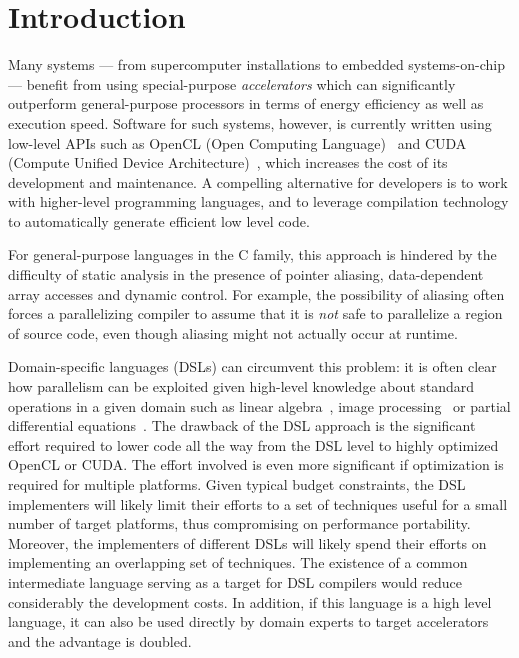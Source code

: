 \section{Introduction}

Many systems --- from supercomputer installations to embedded
systems-on-chip --- benefit from using special-purpose
{\em accelerators} which can significantly outperform general-purpose
processors in terms of energy efficiency as well as
execution speed.
Software for such systems, however, is currently written using
low-level APIs
such as OpenCL (Open Computing Language)~\cite{stoneopencl} and
CUDA (Compute Unified Device Architecture)~\cite{cudaref},
which increases the cost of
its development and maintenance.
A compelling alternative for developers is to work with higher-level
programming languages, and to leverage compilation technology to automatically
generate efficient low level code.

For general-purpose languages in the C family, this approach is hindered
by the difficulty of static analysis in the presence of pointer aliasing,
data-dependent array accesses and dynamic control.
For example, the possibility of aliasing often forces a parallelizing compiler
to assume that it is \emph{not} safe to parallelize a region of source
code, even though aliasing might not actually
occur at runtime.

Domain-specific languages (DSLs)
can circumvent this problem: it is often
clear how parallelism can be exploited given
high-level knowledge about standard operations in a given domain such as
linear algebra~\cite{vobla2014},
image processing~\cite{DBLP:conf/pldi/Ragan-KelleyBAPDA13}
or partial differential equations~\cite{DBLP:journals/toms/AlnaesLORW14}.
The drawback of the DSL approach is the significant effort required to
lower code all the way from the DSL level to highly optimized OpenCL or CUDA.
The effort involved is even more significant if optimization is required
for multiple platforms.
Given typical budget constraints, the DSL implementers will
likely limit their efforts to a set of techniques useful for a small
number of target platforms, thus
compromising on performance portability.  Moreover, the implementers
of different DSLs will likely spend their efforts on implementing an
overlapping set of techniques.
The existence of a common intermediate language serving as a target
for DSL compilers would reduce considerably the development costs.
In addition, if this language is a high level language, it can also
be used directly by domain experts to target accelerators and the
advantage is doubled.

